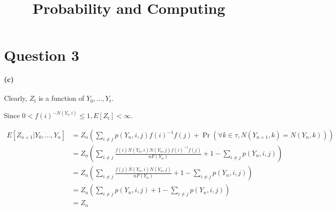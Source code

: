 \documentclass[11pt]{article} %
\title{Probability and Computing}
\author{}
\date{}
\begin{document}
%
\maketitle




\section*{Question 3}

\paragraph{(c)}

Clearly, $Z_t$ is a function of $Y_0,...,Y_t$.

Since $0 < f(i)^{-N(Y_t, i)} \leq 1, E[Z_t] < \infty$.

\begin{equation}
\begin{aligned}
  E[Z_{n+1} | Y_0, ..., Y_n] 
  &= Z_n \left(\sum_{i \neq j} p(Y_n, i, j) f(i)^{-1} f(j) 
  + \Pr (\forall k\in \tau, N(Y_{n+1}, k) = N(Y_n, k)) \right)\\
  &= Z_n \left(\sum_{i\neq j}\frac{f(i)N(Y_n, i)N(Y_n, j)f(i)^{-1}f(j)}{nF(Y_n)} 
  + 1 - \sum_{i\neq j} p(Y_n, i, j)\right) \\
  &= Z_n \left(\sum_{i\neq j}\frac{f(j)N(Y_n, i)N(Y_n, j)}{nF(Y_n)} + 1 - \sum_{i\neq j} p(Y_n, i, j)\right) \\
  &= Z_n \left(\sum_{i\neq j} p(Y_n, i, j) + 1 - \sum_{i\neq j} p(Y_n, i, j)\right)\\
  &= Z_n
\end{aligned}
\end{equation}
\end{document}
